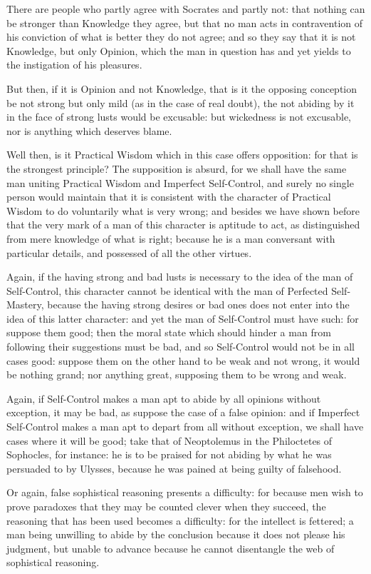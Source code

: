 There are people who partly agree with Socrates and partly not: that nothing
can be stronger than Knowledge they agree, but that no man acts in
contravention of his conviction of what is better they do not agree; and so
they say that it is not Knowledge, but only Opinion, which the man in question
has and yet yields to the instigation of his pleasures.

But then, if it is Opinion and not Knowledge, that is it the opposing
conception be not strong but only mild (as in the case of real doubt), the not
abiding by it in the face of strong lusts would be excusable: but wickedness is
not excusable, nor is anything which deserves blame.

Well then, is it Practical Wisdom which in this case offers opposition: for
that is the strongest principle? The supposition is absurd, for we shall have
the same man uniting Practical Wisdom and Imperfect Self-Control, and surely no
single person would maintain that it is consistent with the character of
Practical Wisdom to do voluntarily what is very wrong; and besides we have
shown before that the very mark of a man of this character is aptitude to act,
as distinguished from mere knowledge of what is right; because he is a man
conversant with particular details, and possessed of all the other virtues.

Again, if the having strong and bad lusts is necessary to the idea of the man
of Self-Control, this character cannot be identical with the man of Perfected
Self-Mastery, because the having strong desires or bad ones does not enter into
the idea of this latter character: and yet the man of Self-Control must have
such: for suppose them good; then the moral state which should hinder a man
from following their suggestions must be bad, and so Self-Control would not be
in all cases good: suppose them on the other hand to be weak and not wrong, it
would be nothing grand; nor anything great, supposing them to be wrong and
weak.

Again, if Self-Control makes a man apt to abide by all opinions without
exception, it may be bad, as suppose the case of a false opinion: and if
Imperfect Self-Control makes a man apt to depart from all without exception, we
shall have cases where it will be good; take that of Neoptolemus in the
Philoctetes of Sophocles, for instance: he is to be praised for not abiding by
what he was persuaded to by Ulysses, because he was pained at being guilty of
falsehood.

Or again, false sophistical reasoning presents a difficulty: for because men
wish to prove paradoxes that they may be counted clever when they succeed, the
reasoning that has been used becomes a difficulty: for the intellect is
fettered; a man being unwilling to abide by the conclusion because it does not
please his judgment, but unable to advance because he cannot disentangle the
web of sophistical reasoning.

